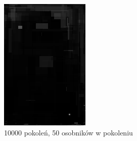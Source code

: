 \begin{figure}[!htb]
    \centering
    \begin{subfigure}[b]{0.3\textwidth}
        \centering
        \label{fig:dependence_10000_50}
         \includegraphics[width=\textwidth]{images/mona/dependence/10000_50.png}
         \caption{10000 pokoleń, 50 osobników w pokoleniu}
    \end{subfigure}
    \begin{subfigure}[b]{0.3\textwidth}
        \centering
        \label{fig:dependence_5000_100}

\end{subfigure}
\end{figure}
